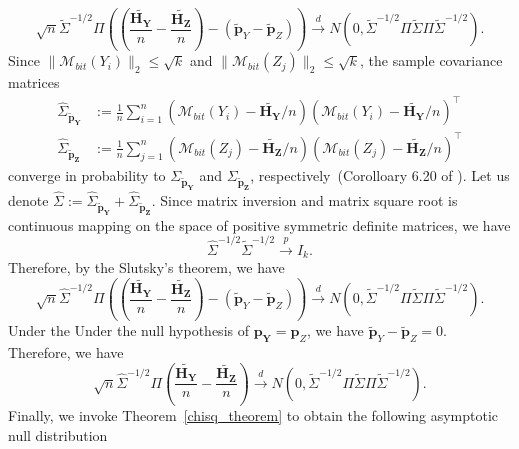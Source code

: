 \documentclass[11pt]{article} %
\begin{document}
\begin{equation}\label{chisq_twosample_second_asymptotic}
	\sqrt{n}
	\tilde{\Sigma}^{-1/2} \Pi
	\left(
	\left(
	\frac{\tilde{\boldsymbol{H}_{\boldsymbol{Y}}}}{n} -
	\frac{\tilde{\boldsymbol{H}_{\boldsymbol{Z}}}}{n}
	\right)
	-
	(\tilde{\boldsymbol{p}}_Y - \tilde{\boldsymbol{p}}_Z)
	\right)
	\stackrel{d}{\to}
	N(0, 
	\tilde{\Sigma}^{-1/2} \Pi
	\tilde{\Sigma}
	\Pi \tilde{\Sigma}^{-1/2}).
\end{equation}
Since  
$\|\mathcal{M}_{bit}(Y_i)\|_2 \leq \sqrt{k}$ and  $\|\mathcal{M}_{bit}(Z_j)\|_2 \leq \sqrt{k}$,
the sample covariance matrices 
\begin{align*}
	\hat{\Sigma}_{\tilde{\boldsymbol{p}}_{\boldsymbol{Y}}} &:=
	\frac{1}{n}
	\sum_{i=1}^n
	(
	\mathcal{M}_{bit}(Y_i) - \tilde{\boldsymbol{H}_{\boldsymbol{Y}}}/n
	)
	(
\mathcal{M}_{bit}(Y_i) - \tilde{\boldsymbol{H}_{\boldsymbol{Y}}}/n
)^\top
\\
	\hat{\Sigma}_{\tilde{\boldsymbol{p}}_{\boldsymbol{Z}}} &:=
\frac{1}{n}
\sum_{j=1}^n
(
\mathcal{M}_{bit}(Z_j) - \tilde{\boldsymbol{H}_{\boldsymbol{Z}}}/n
)
(
\mathcal{M}_{bit}(Z_j) - \tilde{\boldsymbol{H}_{\boldsymbol{Z}}}/n
)^\top
	\end{align*}
converge in probability to  
$\Sigma_{\tilde{\boldsymbol{p}}_{\boldsymbol{Y}}}$ and  $\Sigma_{\tilde{\boldsymbol{p}}_{\boldsymbol{Z}}}$, respectively~(Corolloary 6.20 of \citet{wainwright_high-dimensional_2019}).
Let us denote 
$
\hat{\Sigma} :=	\hat{\Sigma}_{\tilde{\boldsymbol{p}}_{\boldsymbol{Y}}}
+ 
\hat{\Sigma}_{\tilde{\boldsymbol{p}}_{\boldsymbol{Z}}}$.
Since matrix inversion and matrix square root is continuous mapping on the space of positive symmetric definite matrices, we have
\begin{equation}
	\hat{\Sigma}^{-1/2} \tilde{\Sigma}^{-1/2} \stackrel{p}{\to} I_{k}.
\end{equation}
Therefore, by the Slutsky's theorem, we have
\begin{equation}\label{chisq_twosample_third_asymptotic}
	\sqrt{n}
	\hat{\Sigma}^{-1/2} \Pi
	\left(
	\left(
	\frac{\tilde{\boldsymbol{H}_{\boldsymbol{Y}}}}{n} -
	\frac{\tilde{\boldsymbol{H}_{\boldsymbol{Z}}}}{n}
	\right)
	-
	(\tilde{\boldsymbol{p}}_Y - \tilde{\boldsymbol{p}}_Z)
	\right)
	\stackrel{d}{\to}
	N(0, 
	\tilde{\Sigma}^{-1/2} \Pi
	\tilde{\Sigma}
	\Pi \tilde{\Sigma}^{-1/2}).
\end{equation}
\noindent
Under the Under the null hypothesis of $\boldsymbol{p}_{\boldsymbol{Y}} = \boldsymbol{p}_Z $, 
we have $\tilde{\boldsymbol{p}}_Y - \tilde{\boldsymbol{p}}_Z = 0$. Therefore, we have
\begin{equation}\label{chisq_twosample_third_asymptotic}
	\sqrt{n}
	\hat{\Sigma}^{-1/2} \Pi
	\left(
	\frac{\tilde{\boldsymbol{H}_{\boldsymbol{Y}}}}{n} -
	\frac{\tilde{\boldsymbol{H}_{\boldsymbol{Z}}}}{n}
	\right)
	\stackrel{d}{\to}
	N(0, 
	\tilde{\Sigma}^{-1/2} \Pi
	\tilde{\Sigma}
	\Pi \tilde{\Sigma}^{-1/2}).
\end{equation}
Finally, we invoke Theorem~\ref{chisq_theorem} to obtain the following asymptotic null distribution
\end{document}
